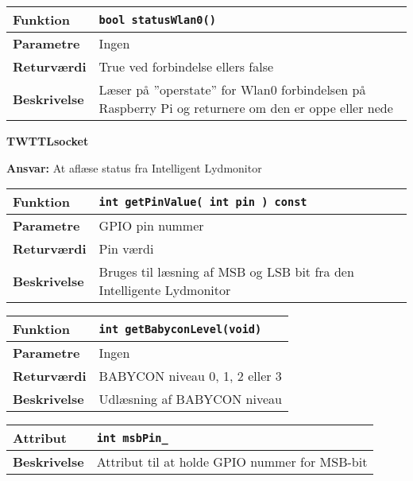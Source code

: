 \begin{center}
    \begin{tabular}{ | l | p{} |}
    \hline
    \textbf{Funktion}	& \verb+bool statusWlan0() +												\\ \hline
    \textbf{Parametre} 	& Ingen																	\\ \hline
    \textbf{Returværdi}	& True ved forbindelse ellers false										\\ \hline
    \textbf{Beskrivelse}	& Læser på ''operstate'' for Wlan0 forbindelsen på Raspberry Pi og returnere om den er oppe eller nede					\\ \hline
    \end{tabular}
\end{center}


{\centering
\textbf{TWTTLsocket}\par
}
\textbf{Ansvar:} At aflæse status fra Intelligent Lydmonitor \

\begin{center}
    \begin{tabular}{ | l | p{} |}
    \hline
    \textbf{Funktion}	& \verb+int getPinValue( int pin ) const + 								\\ \hline
    \textbf{Parametre} 	& GPIO pin nummer														\\ \hline
    \textbf{Returværdi}	& Pin værdi																\\ \hline
    \textbf{Beskrivelse}	& Bruges til læsning af MSB og LSB bit fra den Intelligente Lydmonitor	\\ \hline
    \end{tabular}
\end{center}

\begin{center}
    \begin{tabular}{ | l | p{} |}
    \hline
    \textbf{Funktion}	& \verb+int getBabyconLevel(void) +		 								\\ \hline
    \textbf{Parametre} 	& Ingen																	\\ \hline
    \textbf{Returværdi}	& BABYCON niveau 0, 1, 2 eller 3											\\ \hline
    \textbf{Beskrivelse}	& Udlæsning af BABYCON niveau											\\ \hline
    \end{tabular}
\end{center}


\begin{center}
    \begin{tabular}{ | l | p{} |}
    \hline
    \textbf{Attribut}		& \verb+int msbPin_ +										\\ \hline
    \textbf{Beskrivelse} 	& Attribut til at holde GPIO nummer for MSB-bit				\\ \hline
    \end{tabular}
\end{center}


